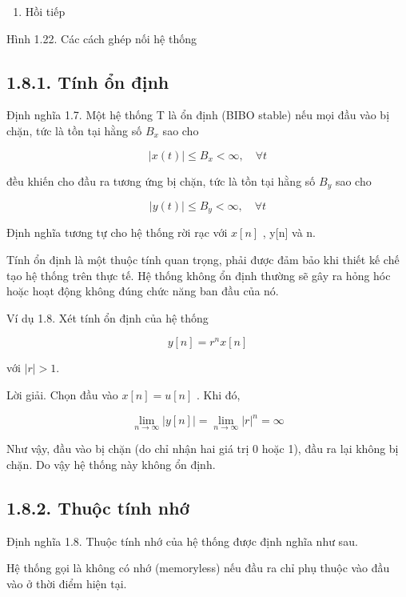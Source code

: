 \documentclass[
  10
]{article}
\providecommand{\tightlist}{%
  \setlength{\itemsep}{0pt}\setlength{\parskip}{0pt}}
\begin{document}
\begin{enumerate}
\def\labelenumi{(\alph{enumi})}
\setcounter{enumi}{2}
\tightlist
\item
  Hồi tiếp
\end{enumerate}

Hình 1.22. Các cách ghép nối hệ thống

\subsection{1.8.1. Tính ổn định}\label{tuxednh-ux1ed5n-ux111ux1ecbnh}

Định nghĩa 1.7. Một hệ thống T là ổn định (BIBO stable) nếu mọi đầu vào
bị chặn, tức là tồn tại hằng số \(B _ { x }\) sao cho

\[
| x (t) | \leq B _ {x} <   \infty , \quad \forall t
\]

đều khiến cho đầu ra tương ứng bị chặn, tức là tồn tại hằng số
\(B _ { y }\) sao cho

\[
| y (t) | \leq B _ {y} <   \infty , \quad \forall t
\]

Định nghĩa tương tự cho hệ thống rời rạc với \(x [ n ]\) , y{[}n{]} và
n.~

Tính ổn định là một thuộc tính quan trọng, phải được đảm bảo khi thiết
kế chế tạo hệ thống trên thực tế. Hệ thống không ổn định thường sẽ gây
ra hỏng hóc hoặc hoạt động không đúng chức năng ban đầu của nó.

Ví dụ 1.8. Xét tính ổn định của hệ thống

\[
y [ n ] = r ^ {n} x [ n ]
\]

với \(| r | > 1 .\)

Lời giải. Chọn đầu vào \(x [ n ] = u [ n ]\) . Khi đó,

\[
\lim _ {n \to \infty} | y [ n ] | = \lim _ {n \to \infty} | r | ^ {n} = \infty
\]

Như vậy, đầu vào bị chặn (do chỉ nhận hai giá trị 0 hoặc 1), đầu ra lại
không bị chặn. Do vậy hệ thống này không ổn định. 

\subsection{1.8.2. Thuộc tính nhớ}\label{thuux1ed9c-tuxednh-nhux1edb}

Định nghĩa 1.8. Thuộc tính nhớ của hệ thống được định nghĩa như sau.

Hệ thống gọi là không có nhớ (memoryless) nếu đầu ra chỉ phụ thuộc vào
đầu vào ở thời điểm hiện tại.
\end{document}
